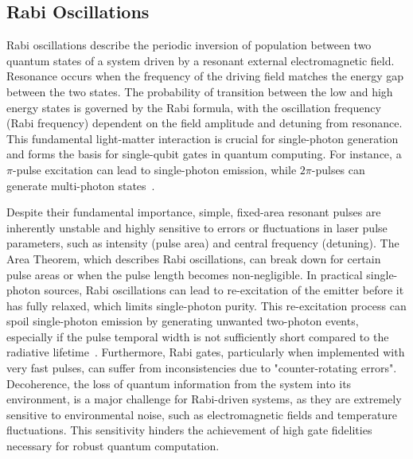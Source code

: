 \documentclass{article}
\begin{document}
\subsection*{Rabi Oscillations}
Rabi oscillations describe the periodic inversion of population between two quantum states of a system driven by a resonant external electromagnetic field. Resonance occurs when the frequency of the driving field matches the energy gap between the two states. The probability of transition between the low and high energy states is governed by the Rabi formula, with the oscillation frequency (Rabi frequency) dependent on the field amplitude and detuning from resonance. This fundamental light-matter interaction is crucial for single-photon generation and forms the basis for single-qubit gates in quantum computing. For instance, a $\pi$-pulse excitation can lead to single-photon emission, while $2\pi$-pulses can generate multi-photon states~\cite{Santori2000TriggeredSP}.

Despite their fundamental importance, simple, fixed-area resonant pulses are inherently unstable and highly sensitive to errors or fluctuations in laser pulse parameters, such as intensity (pulse area) and central frequency (detuning). The Area Theorem, which describes Rabi oscillations, can break down for certain pulse areas or when the pulse length becomes non-negligible. In practical single-photon sources, Rabi oscillations can lead to re-excitation of the emitter before it has fully relaxed, which limits single-photon purity. This re-excitation process can spoil single-photon emission by generating unwanted two-photon events, especially if the pulse temporal width is not sufficiently short compared to the radiative lifetime~\cite{Chanda2023OptimalPT}. Furthermore, Rabi gates, particularly when implemented with very fast pulses, can suffer from inconsistencies due to "counter-rotating errors". Decoherence, the loss of quantum information from the system into its environment, is a major challenge for Rabi-driven systems, as they are extremely sensitive to environmental noise, such as electromagnetic fields and temperature fluctuations. This sensitivity hinders the achievement of high gate fidelities necessary for robust quantum computation.
\end{document}
